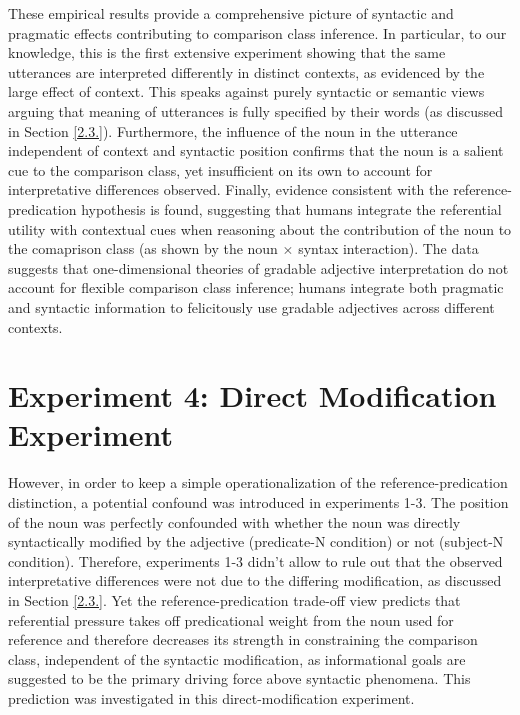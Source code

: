 These empirical results provide a comprehensive picture of syntactic and pragmatic effects contributing to comparison class inference. In particular, to our knowledge, this is the first extensive experiment showing that the same utterances are interpreted differently in distinct contexts, as evidenced by the large effect of context. This speaks against purely syntactic or semantic views arguing that meaning of utterances is fully specified by their words (as discussed in Section \ref{2.3.}). Furthermore, the influence of the noun in the utterance independent of context and syntactic position confirms that the noun is a salient cue to the comparison class, yet insufficient on its own to account for interpretative differences observed. Finally, evidence consistent with the reference-predication hypothesis is found, suggesting that humans integrate the referential utility with contextual cues when reasoning about the contribution of the noun to the comaprison class (as shown by the noun $\times$ syntax interaction). The data suggests that one-dimensional theories of gradable adjective interpretation do not account for flexible comparison class inference; humans integrate both pragmatic and syntactic information to felicitously use gradable adjectives across different contexts. 

\section{Experiment 4: Direct Modification Experiment} 
However, in order to keep a simple operationalization of the reference-predication distinction, a potential confound was introduced in experiments 1-3. The position of the noun was perfectly confounded with whether the noun was directly syntactically modified by the adjective (predicate-N condition) or not (subject-N condition). Therefore, experiments 1-3 didn't allow to rule out that the observed interpretative differences were not due to the differing modification, as discussed in Section \ref{2.3.}.  Yet the reference-predication trade-off view predicts that referential pressure takes off predicational weight from the noun used for reference and therefore decreases its strength in constraining the comparison class, independent of the syntactic modification, as informational goals are suggested to be the primary driving force above syntactic phenomena. This prediction was investigated in this direct-modification experiment.

